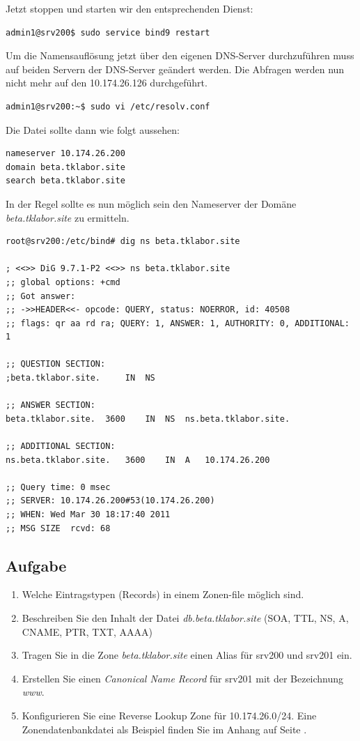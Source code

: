 Jetzt stoppen und starten wir den entsprechenden Dienst:
\begin{lstlisting}
admin1@srv200$ sudo service bind9 restart
\end{lstlisting}

Um die Namensauflösung jetzt über den eigenen DNS-Server durchzuführen muss auf
beiden Servern der DNS-Server geändert werden. Die Abfragen werden nun nicht
mehr auf den 10.174.26.126 durchgeführt.
\begin{lstlisting}
admin1@srv200:~$ sudo vi /etc/resolv.conf
\end{lstlisting}

Die Datei sollte dann wie folgt aussehen:
\begin{scriptsize}
\begin{lstlisting}
nameserver 10.174.26.200
domain beta.tklabor.site
search beta.tklabor.site
\end{lstlisting}
\end{scriptsize}

In der Regel sollte es nun möglich sein den Nameserver der Domäne
\textit{beta.tklabor.site} zu ermitteln.

\begin{scriptsize}
\begin{lstlisting}
root@srv200:/etc/bind# dig ns beta.tklabor.site

; <<>> DiG 9.7.1-P2 <<>> ns beta.tklabor.site
;; global options: +cmd
;; Got answer:
;; ->>HEADER<<- opcode: QUERY, status: NOERROR, id: 40508
;; flags: qr aa rd ra; QUERY: 1, ANSWER: 1, AUTHORITY: 0, ADDITIONAL: 1

;; QUESTION SECTION:
;beta.tklabor.site.		IN	NS

;; ANSWER SECTION:
beta.tklabor.site.	3600	IN	NS	ns.beta.tklabor.site.

;; ADDITIONAL SECTION:
ns.beta.tklabor.site.	3600	IN	A	10.174.26.200

;; Query time: 0 msec
;; SERVER: 10.174.26.200#53(10.174.26.200)
;; WHEN: Wed Mar 30 18:17:40 2011
;; MSG SIZE  rcvd: 68
\end{lstlisting}
\end{scriptsize}

\subsection{Aufgabe}
\begin{enumerate}
  \item Welche Eintragstypen (Records) in einem Zonen-file möglich sind.
  \item Beschreiben Sie den Inhalt der Datei \textit{db.beta.tklabor.site}
  (SOA, TTL, NS, A, CNAME, PTR, TXT, AAAA)
  \item Tragen Sie in die Zone \textit{beta.tklabor.site} einen Alias
  für srv200 und srv201 ein.
  \item Erstellen Sie einen \textit{Canonical Name Record} für srv201 mit der
  Bezeichnung \textit{www}.
  \item Konfigurieren Sie eine Reverse Lookup Zone für 10.174.26.0/24. Eine
  Zonendatenbankdatei als Beispiel finden Sie im Anhang auf Seite
  \pageref{cfg:bind-reverse-lookup}.
 \end{enumerate}

